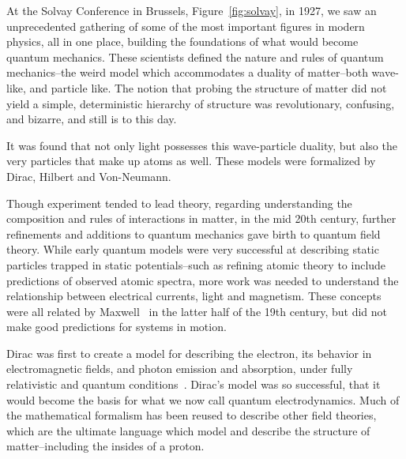 At the Solvay Conference in Brussels, Figure~\ref{fig:solvay}, in 1927, we saw
an unprecedented gathering of some of the most important figures in modern
physics, all in one place, building the foundations of what would become
quantum mechanics. These scientists defined the nature and rules of quantum
mechanics--the weird model which accommodates a duality of matter--both
wave-like, and particle like. The notion that probing the structure of matter
did not yield a simple, deterministic hierarchy of structure was revolutionary,
confusing, and bizarre, and still is to this day.

It was found that not only light possesses this wave-particle duality, but also
the very particles that make up atoms as well. These models were formalized by
Dirac, Hilbert and Von-Neumann.

Though experiment tended to lead theory, regarding understanding the composition
and rules of interactions in matter, in the mid 20th century, further
refinements and additions to quantum mechanics gave birth to quantum field
theory. While early quantum models were very successful at describing static
particles trapped in static potentials--such as refining atomic theory to
include predictions of observed atomic spectra, more work was needed to
understand the relationship between electrical currents, light and magnetism.
These concepts were all related by Maxwell~\cite{Maxwell1865} in the latter half
of the 19th century, but did not make good predictions for systems in motion.

Dirac was first to create a model for describing the electron, its behavior in
electromagnetic fields, and photon emission and absorption, under fully
relativistic and quantum conditions~\cite{Dirac}. Dirac's model was so
successful, that it would become the basis for what we now call quantum
electrodynamics. Much of the mathematical formalism has been reused to describe
other field theories, which are the ultimate language which model and describe
the structure of matter--including the insides of a proton. 

